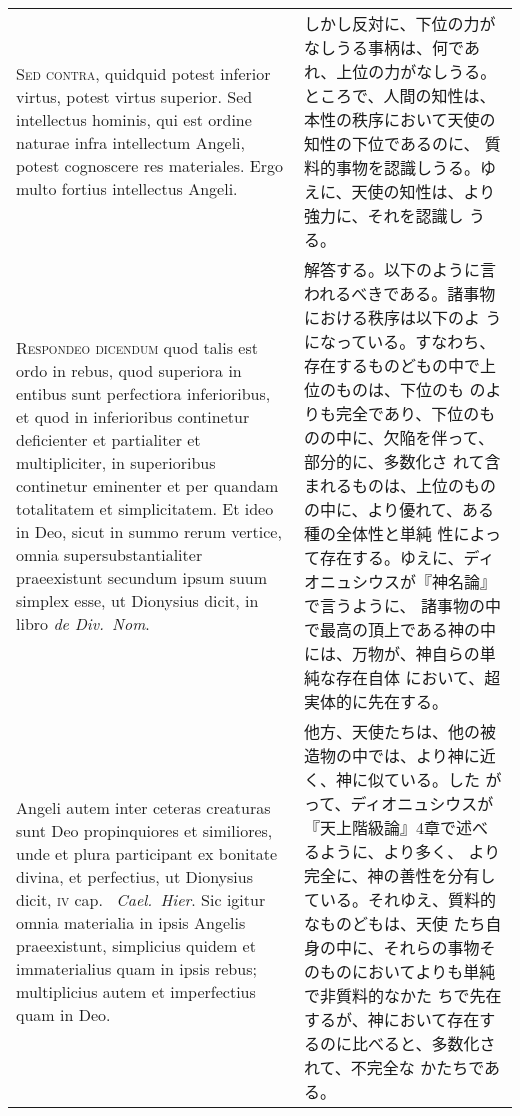 \documentclass[10pt]{jsarticle} %
\begin{document}
\begin{longtable}{p{21em}p{21em}}
\\


{\scshape Sed contra}, quidquid potest inferior virtus, potest virtus
superior. Sed intellectus hominis, qui est ordine naturae infra
intellectum Angeli, potest cognoscere res materiales. Ergo multo
fortius intellectus Angeli.


&

しかし反対に、下位の力がなしうる事柄は、何であれ、上位の力がなしうる。
ところで、人間の知性は、本性の秩序において天使の知性の下位であるのに、
質料的事物を認識しうる。ゆえに、天使の知性は、より強力に、それを認識し
うる。


\\


{\scshape Respondeo dicendum} quod talis est ordo in rebus, quod
superiora in entibus sunt perfectiora inferioribus, et quod in
inferioribus continetur deficienter et partialiter et multipliciter,
in superioribus continetur eminenter et per quandam totalitatem et
simplicitatem. Et ideo in Deo, sicut in summo rerum vertice, omnia
supersubstantialiter praeexistunt secundum ipsum suum simplex esse, ut
Dionysius dicit, in libro {\itshape de Div.~Nom}.


&

解答する。以下のように言われるべきである。諸事物における秩序は以下のよ
うになっている。すなわち、存在するものどもの中で上位のものは、下位のも
のよりも完全であり、下位のものの中に、欠陥を伴って、部分的に、多数化さ
れて含まれるものは、上位のものの中に、より優れて、ある種の全体性と単純
性によって存在する。ゆえに、ディオニュシウスが『神名論』で言うように、
諸事物の中で最高の頂上である神の中には、万物が、神自らの単純な存在自体
において、超実体的に先在する。

\\


Angeli autem inter ceteras creaturas sunt Deo propinquiores et
similiores, unde et plura participant ex bonitate divina, et
perfectius, ut Dionysius dicit, {\scshape iv} cap.~{\itshape
Cael.~Hier}. Sic igitur omnia materialia in ipsis Angelis
praeexistunt, simplicius quidem et immaterialius quam in ipsis rebus;
multiplicius autem et imperfectius quam in Deo.

&

他方、天使たちは、他の被造物の中では、より神に近く、神に似ている。した
がって、ディオニュシウスが『天上階級論』4章で述べるように、より多く、
より完全に、神の善性を分有している。それゆえ、質料的なものどもは、天使
たち自身の中に、それらの事物そのものにおいてよりも単純で非質料的なかた
ちで先在するが、神において存在するのに比べると、多数化されて、不完全な
かたちである。



\end{longtable}
\end{document}
